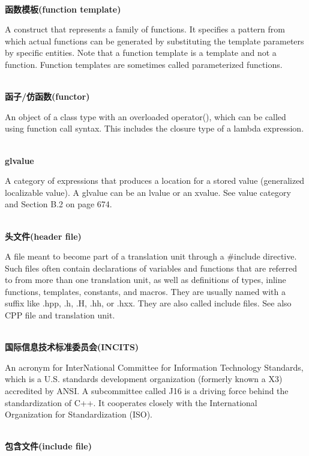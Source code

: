 \hspace*{\fill} \\ %
\noindent
\textbf{函数模板(function template)}

A construct that represents a family of functions. It specifies a pattern from which actual functions can be generated by substituting the template parameters by specific entities. Note that a function template is a template and not a function. Function templates are sometimes called parameterized functions.

\hspace*{\fill} \\ %
\noindent
\textbf{函子/仿函数(functor)}

An object of a class type with an overloaded operator(), which can be called using function call syntax. This includes the closure type of a lambda expression.

\hspace*{\fill} \\ %
\noindent
\textbf{glvalue}

A category of expressions that produces a location for a stored value (generalized localizable value). A glvalue can be an lvalue or an xvalue. See value category and Section B.2 on page 674.

\hspace*{\fill} \\ %
\noindent
\textbf{头文件(header file)}

A file meant to become part of a translation unit through a \#include directive. Such files often contain declarations of variables and functions that are referred to from more than one translation unit, as well as definitions of types, inline functions, templates, constants, and macros. They are usually named with a suffix like .hpp, .h, .H, .hh, or .hxx. They are also called include files. See also CPP file and translation unit.

\hspace*{\fill} \\ %
\noindent
\textbf{国际信息技术标准委员会(INCITS)}

An acronym for InterNational Committee for Information Technology Standards, which is a U.S. standards development organization (formerly known a X3) accredited by ANSI. A subcommittee called J16 is a driving force behind the standardization of C++. It cooperates closely with the International Organization for Standardization (ISO).

\hspace*{\fill} \\ %
\noindent
\textbf{包含文件(include file)}

